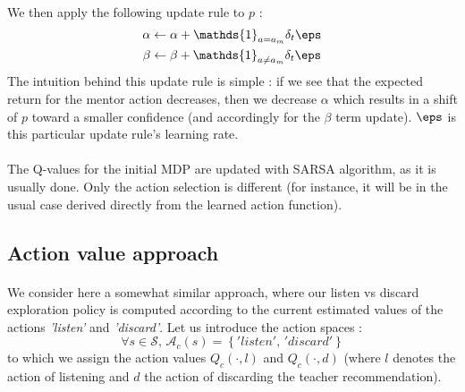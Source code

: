 \documentclass[a4paper]{report}
\begin{document}
{{{{			\paragraph{} We then apply the following update rule to $p$ : 
			\begin{equation}
				\begin{aligned}
					\alpha &\leftarrow \alpha +  \mathds{1}_{a=a_m}\delta_t \eps\\
					\beta &\leftarrow \beta +   \mathds{1}_{a\neq a_m}\delta_t \eps
				\end{aligned}
			\end{equation}
			The intuition behind this update rule is simple : if we see that the expected return for the mentor action decreases, then we decrease $\alpha$ which results in a shift of $p$ toward a smaller confidence (and accordingly for the $\beta$ term update). $\eps$ is this particular update rule's learning rate. 
		
			\paragraph{} The Q-values for the initial MDP are updated with SARSA algorithm, as it is usually done. Only the action selection is different (for instance, it will be in the usual case derived directly from the learned action function). 
		}
	
		\subsection{Action value approach}
		{
			\paragraph{} We consider here a somewhat similar approach, where our listen vs discard exploration policy is computed according to the current estimated values of the actions \emph{'listen'} and \emph{'discard'}. Let us introduce the action spaces : 
			\begin{equation}
				\forall s\in\mathcal{S}, \, \mathcal{A}_c(s) = \left\{ 'listen', \, 'discard'\right\}
			\end{equation}
			to which we assign the action values $Q_c(\cdot,l)$ and  $Q_c(\cdot,d)$ (where $l$ denotes the action of listening and $d$ the action of discarding the teacher recommendation). 
			
}}}}
\end{document}
